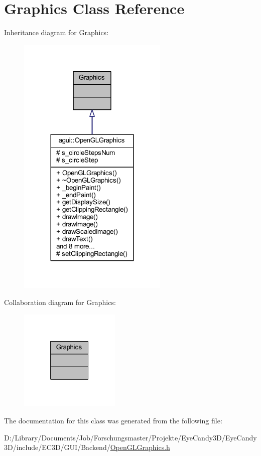 \hypertarget{class_graphics}{}\section{Graphics Class Reference}
\label{class_graphics}


Inheritance diagram for Graphics\+:\nopagebreak
\begin{figure}[H]
\begin{center}
\leavevmode
\includegraphics[width=203pt]{class_graphics__inherit__graph}
\end{center}
\end{figure}


Collaboration diagram for Graphics\+:\nopagebreak
\begin{figure}[H]
\begin{center}
\leavevmode
\includegraphics[width=136pt]{class_graphics__coll__graph}
\end{center}
\end{figure}


The documentation for this class was generated from the following file\+:\begin{DoxyCompactItemize}
\item 
D\+:/\+Library/\+Documents/\+Job/\+Forschungsmaster/\+Projekte/\+Eye\+Candy3\+D/\+Eye\+Candy3\+D/include/\+E\+C3\+D/\+G\+U\+I/\+Backend/\mbox{\hyperlink{_open_g_l_graphics_8h}{Open\+G\+L\+Graphics.\+h}}\end{DoxyCompactItemize}
